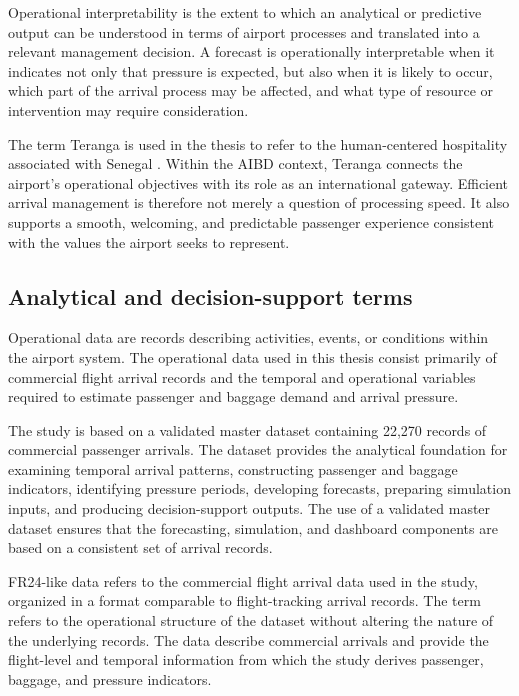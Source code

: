 Operational interpretability is the extent to which an analytical or predictive output can be understood in terms of airport processes and translated into a relevant management decision. A forecast is operationally interpretable when it indicates not only that pressure is expected, but also when it is likely to occur, which part of the arrival process may be affected, and what type of resource or intervention may require consideration.

The term Teranga is used in the thesis to refer to the human-centered hospitality associated with Senegal \parencite{demir2025speaker}. Within the AIBD context, Teranga connects the airport's operational objectives with its role as an international gateway. Efficient arrival management is therefore not merely a question of processing speed. It also supports a smooth, welcoming, and predictable passenger experience consistent with the values the airport seeks to represent.

\subsection{Analytical and decision-support terms}
\label{subsec:analytical-decision-support-terms}

Operational data are records describing activities, events, or conditions within the airport system. The operational data used in this thesis consist primarily of commercial flight arrival records and the temporal and operational variables required to estimate passenger and baggage demand and arrival pressure.

The study is based on a validated master dataset containing 22,270 records of commercial passenger arrivals. The dataset provides the analytical foundation for examining temporal arrival patterns, constructing passenger and baggage indicators, identifying pressure periods, developing forecasts, preparing simulation inputs, and producing decision-support outputs. The use of a validated master dataset ensures that the forecasting, simulation, and dashboard components are based on a consistent set of arrival records.

FR24-like data refers to the commercial flight arrival data used in the study, organized in a format comparable to flight-tracking arrival records. The term refers to the operational structure of the dataset without altering the nature of the underlying records. The data describe commercial arrivals and provide the flight-level and temporal information from which the study derives passenger, baggage, and pressure indicators.

